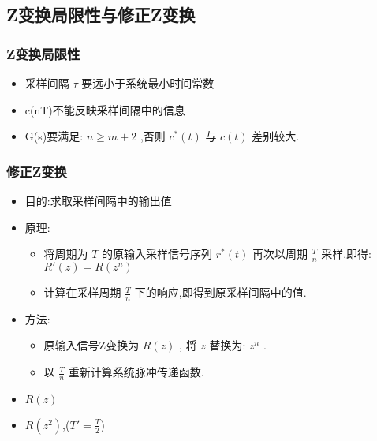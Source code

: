 \documentclass[table]{article}
\begin{document}
\subsection{Z变换局限性与修正Z变换}
\label{sec-4-5}
\begin{frame}
\frametitle{Z变换局限性}
\label{sec-4-5-1}

\begin{itemize}
\item <2->采样间隔 $\tau$  要远小于系统最小时间常数
\item <3->c(nT)不能反映采样间隔中的信息
\item <4->G(s)要满足:  $n\geq m+2$  ,否则  $c^*(t)$  与  $c(t)$  差别较大.
\end{itemize}
\end{frame}
\begin{frame}
\frametitle{修正Z变换}
\label{sec-4-5-2}

\begin{itemize}
\item 目的:求取采样间隔中的输出值
\item 原理:
\begin{itemize}
\item <2->将周期为  $T$  的原输入采样信号序列 $r^*(t)$ 再次以周期  $\frac{T}{n}$  采样,即得:  $R'(z)=R(z^n)$
\item <3->计算在采样周期  $\frac{T}{n}$  下的响应,即得到原采样间隔中的值.
\end{itemize}
\item 方法:
\begin{itemize}
\item <4->原输入信号Z变换为  $R(z)$ , 将 $z$  替换为:  $z^n$  .
\item <5->以  $\frac{T}{n}$ 重新计算系统脉冲传递函数.
\end{itemize}
\end{itemize}
\begin{itemize}

\item $R(z)$
\label{sec-4-5-2-1}%

\item $R(z^2)$,($T'=\frac{T}{2}$)
\label{sec-4-5-2-2}%
\end{itemize} %
\end{frame}
\end{document}
